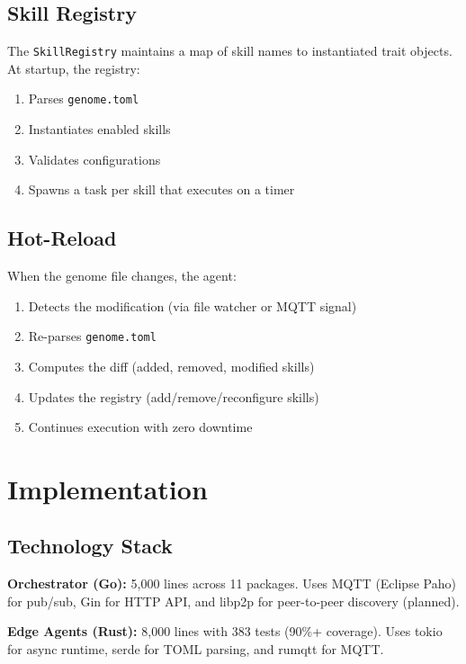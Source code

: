 \documentclass{article}
\begin{document}
\subsection{Skill Registry}

The \texttt{SkillRegistry} maintains a map of skill names to instantiated trait objects. At startup, the registry:
\begin{enumerate}
    \item Parses \texttt{genome.toml}
    \item Instantiates enabled skills
    \item Validates configurations
    \item Spawns a task per skill that executes on a timer
\end{enumerate}

\subsection{Hot-Reload}

When the genome file changes, the agent:
\begin{enumerate}
    \item Detects the modification (via file watcher or MQTT signal)
    \item Re-parses \texttt{genome.toml}
    \item Computes the diff (added, removed, modified skills)
    \item Updates the registry (add/remove/reconfigure skills)
    \item Continues execution with zero downtime
\end{enumerate}

\section{Implementation}\label{sec:implementation}

\subsection{Technology Stack}

\textbf{Orchestrator (Go):} 5,000 lines across 11 packages. Uses MQTT (Eclipse Paho) for pub/sub, Gin for HTTP API, and libp2p for peer-to-peer discovery (planned).

\textbf{Edge Agents (Rust):} 8,000 lines with 383 tests (90\%+ coverage). Uses tokio for async runtime, serde for TOML parsing, and rumqtt for MQTT.
\end{document}
